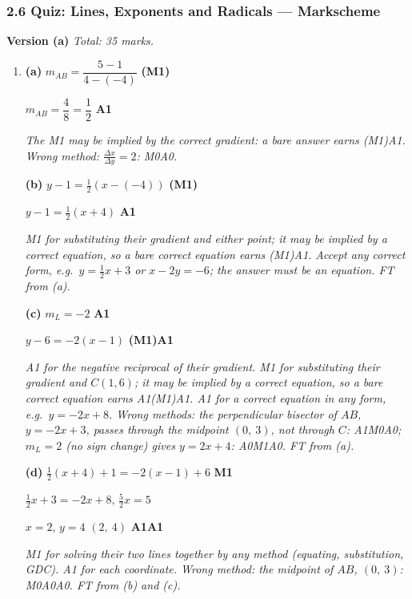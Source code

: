 \documentclass[12pt, twoside]{article}
\begin{document}
\subsubsection*{2.6 Quiz: Lines, Exponents and Radicals --- Markscheme}

\textbf{\large Version (a)} \hfill \emph{Total: 35 marks.}

\begin{enumerate}[itemsep=0.3cm]

\item[1.] [Maximum mark: 10]

\textbf{(a)} $m_{AB} = \dfrac{5 - 1}{4 - (-4)}$ \hfill \textbf{(M1)}

$m_{AB} = \dfrac{4}{8} = \dfrac{1}{2}$ \hfill \textbf{A1}

\emph{The M1 may be implied by the correct gradient: a bare answer earns
(M1)A1. Wrong method: $\frac{\Delta x}{\Delta y} = 2$: M0A0.}

\textbf{(b)} $y - 1 = \frac{1}{2}\left(x - (-4)\right)$ \hfill \textbf{(M1)}

$y - 1 = \frac{1}{2}(x + 4)$ \hfill \textbf{A1}

\emph{M1 for substituting their gradient and either point; it may be
implied by a correct equation, so a bare correct equation earns (M1)A1.
Accept any correct form, e.g.\ $y = \frac{1}{2}x + 3$ or $x - 2y = -6$;
the answer must be an equation. FT from (a).}

\textbf{(c)} $m_{L} = -2$ \hfill \textbf{A1}

$y - 6 = -2(x - 1)$ \hfill \textbf{(M1)A1}

\emph{A1 for the negative reciprocal of their gradient. M1 for substituting
their gradient and $C(1, 6)$; it may be implied by a correct equation, so a
bare correct equation earns A1(M1)A1. A1 for a correct equation in any form, e.g.\
$y = -2x + 8$. Wrong methods: the perpendicular bisector of $AB$,
$y = -2x + 3$, passes through the midpoint $(0,\ 3)$, not through $C$:
A1M0A0; $m_{L} = 2$ (no sign change) gives $y = 2x + 4$: A0M1A0. FT from
(a).}

\textbf{(d)} $\frac{1}{2}(x + 4) + 1 = -2(x - 1) + 6$ \hfill \textbf{M1}

$\frac{1}{2}x + 3 = -2x + 8$, \quad $\frac{5}{2}x = 5$

$x = 2$, \quad $y = 4$ \qquad $(2,\ 4)$ \hfill \textbf{A1A1}

\emph{M1 for solving their two lines together by any method (equating,
substitution, GDC). A1 for each coordinate. Wrong method: the midpoint of
$AB$, $(0,\ 3)$: M0A0A0. FT from (b) and (c).}


\end{enumerate}
\end{document}
